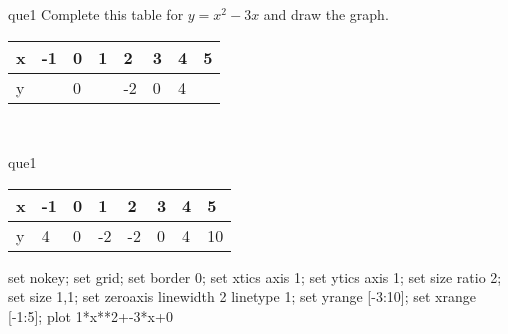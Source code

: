 \documentclass[13.5pt, varwidth=true]{beamer}
\begin{document}
\begin{frame}[shrink=19,fragile]
	\begin{beamercolorbox}[rounded=true, left, shadow=true,wd=14.8cm]{que1}
		 Complete this table for $y = x^{2} - 3x$ and draw the graph. \\[0.3cm] \renewcommand{\arraystretch}{1.2}\begin{tabular}{|C|C|C|C|C|C|C|C|} \hline x & -1 & 0 & 1 & 2 & 3 & 4 & 5 \\ \hline y &  & 0 &  & -2 & 0 & 4 & \\ \hline \end{tabular}\\[0.3cm]
	\end{beamercolorbox}
\end{frame}
\begin{frame}[shrink=19,fragile]
	\begin{beamercolorbox}[rounded=true, left, shadow=true,wd=14.8cm]{que1}
		\renewcommand{\arraystretch}{1.2}\begin{tabular}{|C|C|C|C|C|C|C|C|} \hline x & -1 & 0 & 1 & 2 & 3 & 4 & 5 \\ \hline y & 4 & 0 & -2 & -2 & 0 & 4 & 10\\ \hline \end{tabular}\begin{gnuplot}[terminal=pdf] set nokey; set grid; set border 0; set xtics axis 1; set ytics axis 1; set size ratio 2; set size 1,1; set zeroaxis linewidth 2 linetype 1; set yrange [-3:10]; set xrange [-1:5]; plot 1*x**2+-3*x+0 \end{gnuplot}
	\end{beamercolorbox}
\end{frame}
\end{document}
